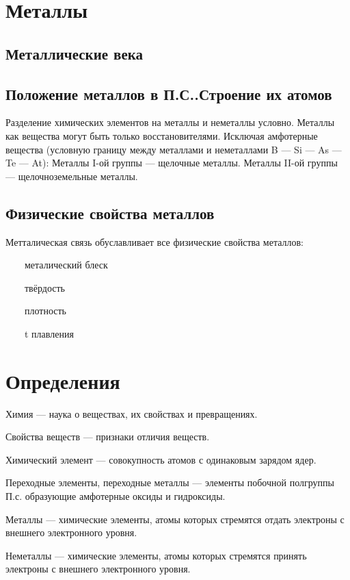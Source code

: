 \documentclass[a4paper, 12pt]{article}
\newcommand{\tab}{~~\llap{\textbullet}~~}
\begin{document}
	    

	    
	    
\section{Металлы}
    	\subsection{Металлические века}
    	\subsection{Положение металлов в П.С..Строение их атомов}
    		Разделение химических элементов на металлы и неметаллы условно. 
    		Металлы как вещества могут быть только восстановителями.
    		Исключая амфотерные вещества (условную границу между металлами и неметаллами B --- Si --- As --- Te --- At):
    		Металлы I-ой группы --- щелочные металлы.
    		Металлы II-ой группы --- щелочноземельные металлы.
    	\subsection{Физические свойства металлов}
    		Метталическая связь обуславливает все физические свойства металлов:
    		
    		\tab металический блеск
    		
    		\tab твёрдость
    		
    		\tab плотность
    		
    		\tab t плавления
    	    
\section{Определения}
        Химия --- наука о веществах, их свойствах и превращениях.
        
        Свойства веществ  --- признаки отличия веществ.

		Химический элемент --- совокупность атомов с одинаковым зарядом ядер.

		Переходные элементы, переходные металлы --- элементы побочной полгруппы П.с. образующие амфотерные оксиды и гидроксиды.
        
        Металлы --- химические элементы, атомы которых стремятся отдать электроны с внешнего электронного уровня.
        
        Неметаллы --- химические элементы, атомы которых стремятся принять электроны с внешнего электронного уровня.
        
\end{document}
